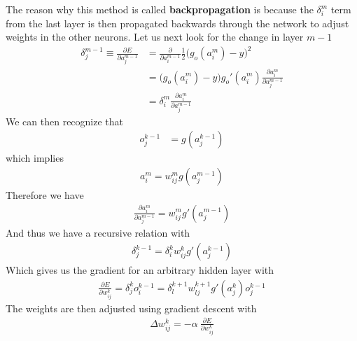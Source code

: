 The reason why this method is called \textbf{backpropagation} is because the $\delta_i^m$ term from the last layer is then propagated backwards through the network to adjust weights in the other neurons. Let us next look for the change in layer $m-1$
\begin{align}
	\delta_j^{m-1} \equiv \frac{\partial E}{\partial a_{j}^{m-1}} &= \frac{\partial}{\partial{a_i^{m-1}}}\frac{1}{2}\Big(g_o(a_{i}^m)-y\Big)^2 \\
	&=\Big(g_o(a_{i}^m)-y\Big)g_o'(a_{i}^m)\frac{\partial a_{i}^m}{\partial a_{j}^{m-1}}\\
	&= \delta_i^m \frac{\partial a_{i}^m}{\partial a_{j}^{m-1}}
\end{align}
We can then recognize that
\begin{align}
	o_j^{k-1} &= g(a_j^{k-1})
\end{align}
which implies
\begin{align}
	a_i^m = w_{ij}^m g(a_j^{m-1})
\end{align}
Therefore we have
\begin{align}
	\frac{\partial a_{i}^m}{\partial a_{j}^{m-1}} = w_{ij}^m g'(a_j^{m-1})
\end{align}
And thus we have a recursive relation with
\begin{align}
	\delta_j^{k-1} = \delta_i^k w_{ij}^k g'(a_j^{k-1})
\end{align}
Which gives us the gradient for an arbitrary hidden layer with
\begin{align}
	\frac{\partial E}{\partial w_{ij}^k} = \delta_j^{k}o_i^{k-1} = \delta_l^{k+1} w_{lj}^{k+1} g'(a_j^{k})o_j^{k-1}
\end{align}
The weights are then adjusted using gradient descent with
\begin{align}
	\Delta w_{ij}^k = -\alpha~  \frac{\partial E}{\partial w_{ij}^k}
\end{align}
